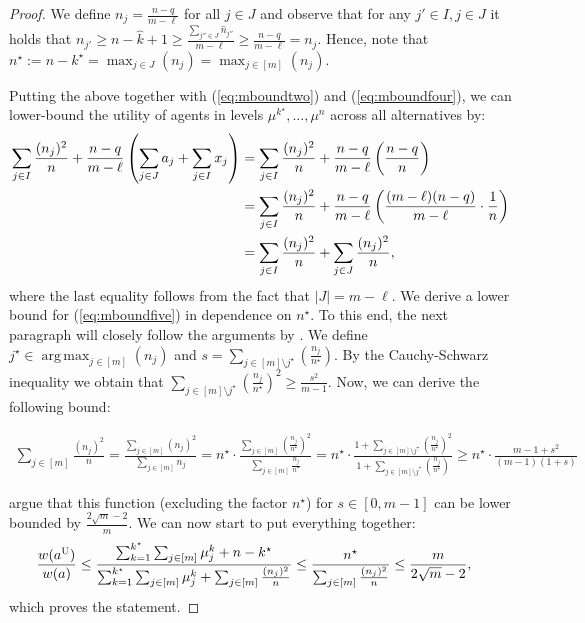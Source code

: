 \documentclass[11pt]{article}
\DeclareMathOperator*{\argmax}{arg\,max}
\newcommand{\Uts}{\textsc{U} } %
\begin{document}
\begin{proof}
        
        
        
        
        

    We define $n_j = \frac{n-q}{m-\ell}$ for all $j \in J$ and observe that for any $j' \in I, j \in J$ it holds that $n_{j'} \geq n-\hat{k}+1 \geq \frac{\sum_{j'' \in J}\hat{n}_{j''}}{m-\ell}\geq \frac{n-q}{m-\ell} = n_{j}$. Hence, note that $n^\star := n - k^\star= \max_{j \in J}(n_j)= \max_{j \in [m]}(n_j)$.
    
    Putting the above together with (\ref{eq:mboundtwo}) and (\ref{eq:mboundfour}), we can lower-bound the utility of agents in levels $\mu^{k^\star}, \dots, \mu^n$ across all alternatives by: 
    \begin{align}
    \sum_{j \in I} \frac{(n_j)^2}{n}+ \frac{n-q}{m-\ell}\left(\sum_{j \in J} a_j + \sum_{j \in I} x_j\right) & = \sum_{j \in I} \frac{(n_j)^2}{n} + \frac{n-q}{m-\ell}\left(\frac{n-q}{n}{}\right) \notag \\ & = \sum_{j \in I} \frac{(n_j)^2}{n} + \frac{n-q}{m-\ell}\left(\frac{(m-\ell)(n-q)}{m-\ell} \cdot \frac{1}{n}{}\right)  \notag \\ 
    & = \sum_{j \in I} \frac{(n_j)^2}{n} + \sum_{j \in J}\frac{(n_j)^2}{n}, \label{eq:mboundfive} 
    \end{align}
    where the last equality follows from the fact that $|J|=m-\ell$. 
     We derive a lower bound for (\ref{eq:mboundfive}) in dependence on $n^\star$. To this end, the next paragraph will closely follow the arguments by \citet{MPS20a}. We define $j^\star \in \argmax _{j \in [m]} (n_j)$ and $s = \sum_{j \in [m] \setminus j^\star}(\frac{n_j}{n^\star})$. By the Cauchy-Schwarz inequality we obtain that $\sum_{j \in [m] \setminus j^\star}(\frac{n_j}{n^\star})^2 \geq \frac{s^2}{m-1}$. Now, we can derive the following bound: 

    \begin{align*}
        \sum_{j \in [m]} \frac{(n_j)^2}{n} = \frac{\sum_{j \in [m]}(n_j)^2}{\sum_{j \in [m]}n_j} = n^\star \cdot \frac{\sum_{j \in [m]}(\frac{n_j}{n^\star})^2}{\sum_{j \in [m]}\frac{n_j}{n^\star}} = n^\star \cdot \frac{1 + \sum_{j \in [m] \setminus j^\star}(\frac{n_j}{n^\star})^2}{1 + \sum_{j \in [m] \setminus j^\star}(\frac{n_j}{n^\star})} \geq n^\star \cdot \frac{m-1 + s^2}{(m-1)(1+s)}
    \end{align*}

    \citet{MPS20a} argue that this function (excluding the factor $n^\star$) for $s \in [0,m-1]$ can be lower bounded by $\frac{2 \sqrt{m} - 2}{m}$. We can now start to put everything together: 
    \begin{align*}
        \frac{w(a^{\Uts})}{w(a)} & \leq \frac{\sum_{k=1}^{k^\star}\sum_{j \in [m]}\mu_j^k + n - k^{\star}}{\sum_{k=1}^{k^\star}\sum_{j \in [m]}\mu_j^k + \sum_{j \in [m]} \frac{(n_j)^2}{n}} %
        \leq  \frac{n^{\star}}{\sum_{j \in [m]} \frac{(n_j)^2}{n}} %
        \leq \frac{m}{2\sqrt{m} - 2}, 
    \end{align*}
    which proves the statement.
    \end{proof}
\end{document}
